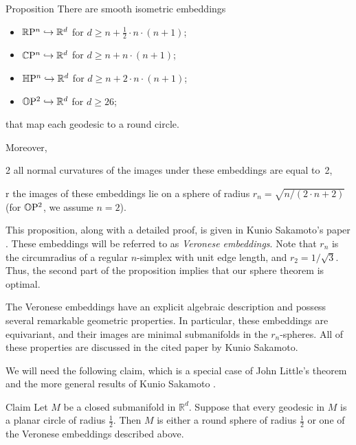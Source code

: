 \documentclass[a4paper,10pt]{article}
\begin{document}
\begin{thm}{Proposition}
There are smooth isometric embeddings
\begin{itemize}
 \item $\mathbb{R}\mathrm{P}^n \hookrightarrow\mathbb{R}^d$ for $d\geqslant n+\tfrac12\cdot n\cdot(n+1)$;
 \item $\mathbb{C}\mathrm{P}^n \hookrightarrow\mathbb{R}^d$ for $d\geqslant n+n\cdot(n+1)$;
 \item $\mathbb{H}\mathrm{P}^n \hookrightarrow\mathbb{R}^d$ for $d\geqslant n+2\cdot n\cdot(n+1)$;
 \item $\mathbb{O}\mathrm{P}^2 \hookrightarrow\mathbb{R}^d$ for $d\geqslant 26$;
\end{itemize}
that map each geodesic to a round circle.

Moreover,

\begin{subthm}{2}
all normal curvatures of the images under these embeddings are equal to~2,
\end{subthm}

\begin{subthm}{r}
the images of these embeddings lie on a sphere of radius \( r_n = \sqrt{n / (2 \cdot n + 2)} \)
(for \( \mathbb{O}\mathrm{P}^2 \), we assume \( n = 2 \)).
\end{subthm}


\end{thm}

This proposition, along with a detailed proof, is given in Kunio Sakamoto's paper \cite[§ 2]{sakamoto}.
These embeddings will be referred to as \emph{Veronese embeddings}.
Note that \( r_n \) is the circumradius of a regular \( n \)-simplex with unit edge length, and \(r_2 = 1 / \sqrt{3}\).
Thus, the second part of the proposition implies that our sphere theorem is optimal.

The Veronese embeddings have an explicit algebraic description and possess several remarkable geometric properties.
In particular, these embeddings are equivariant, and their images are minimal submanifolds in the \( r_n \)-spheres.
All of these properties are discussed in the cited paper by Kunio Sakamoto.

We will need the following claim, which is a special case of John Little's theorem \cite{little} and the more general results of Kunio Sakamoto \cite[Theorem 3]{sakamoto}.

\begin{thm}{Claim}
Let \( M \) be a closed  submanifold in \( \mathbb{R}^d \).
Suppose that every geodesic in \( M \) is a planar circle of radius \( \tfrac{1}{2} \).
Then \( M \) is either a round sphere of radius \( \tfrac{1}{2} \) or one of the Veronese embeddings described above.
\end{thm}
\end{document}
